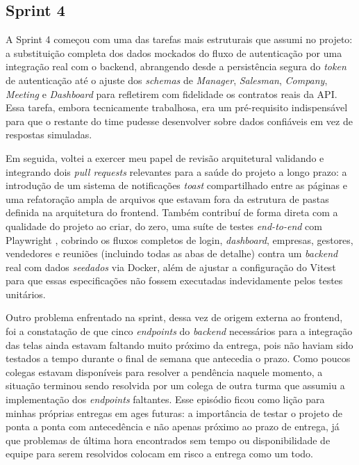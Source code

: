 \subsection{Sprint 4}

A Sprint 4 começou com uma das tarefas mais estruturais que assumi no projeto: a substituição completa dos dados mockados do fluxo de autenticação por uma integração real com o backend, abrangendo desde a persistência segura do \textit{token} de autenticação até o ajuste dos \textit{schemas} de \textit{Manager}, \textit{Salesman}, \textit{Company}, \textit{Meeting} e \textit{Dashboard} para refletirem com fidelidade os contratos reais da API. Essa tarefa, embora tecnicamente trabalhosa, era um pré-requisito indispensável para que o restante do time pudesse desenvolver sobre dados confiáveis em vez de respostas simuladas.

Em seguida, voltei a exercer meu papel de revisão arquitetural validando e integrando dois \textit{pull requests} relevantes para a saúde do projeto a longo prazo: a introdução de um sistema de notificações \textit{toast} compartilhado entre as páginas e uma refatoração ampla de arquivos que estavam fora da estrutura de pastas definida na arquitetura do frontend. Também contribuí de forma direta com a qualidade do projeto ao criar, do zero, uma suíte de testes \textit{end-to-end} com Playwright \cite{Playwright}, cobrindo os fluxos completos de login, \textit{dashboard}, empresas, gestores, vendedores e reuniões (incluindo todas as abas de detalhe) contra um \textit{backend} real com dados \textit{seedados} via Docker, além de ajustar a configuração do Vitest \cite{Vitest} para que essas especificações não fossem executadas indevidamente pelos testes unitários.

Outro problema enfrentado na sprint, dessa vez de origem externa ao frontend, foi a constatação de que cinco \textit{endpoints} do \textit{backend} necessários para a integração das telas ainda estavam faltando muito próximo da entrega, pois não haviam sido testados a tempo durante o final de semana que antecedia o prazo. Como poucos colegas estavam disponíveis para resolver a pendência naquele momento, a situação terminou sendo resolvida por um colega de outra turma que assumiu a implementação dos \textit{endpoints} faltantes. Esse episódio ficou como lição para minhas próprias entregas em \ac{ages} futuras: a importância de testar o projeto de ponta a ponta com antecedência e não apenas próximo ao prazo de entrega, já que problemas de última hora encontrados sem tempo ou disponibilidade de equipe para serem resolvidos colocam em risco a entrega como um todo.

